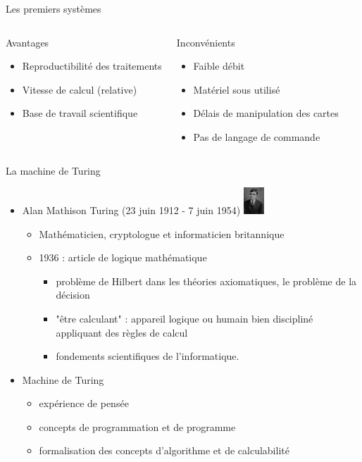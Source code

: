 \begin{frame}{Les premiers systèmes}
\begin{columns}
\begin{block}{Avantages}
\begin{itemize}
\item Reproductibilité des traitements
\item Vitesse de calcul (relative)
\item Base de travail scientifique
\end{itemize}
\end{block}
\begin{block}{Inconvénients}
\begin{itemize}
\item Faible débit
\item Matériel sous utilisé
\item Délais de manipulation des cartes
\item Pas de langage de commande
\end{itemize}
\end{block}
\end{columns}
\end{frame}

\begin{frame}{La machine de Turing \cite{wp-turing}}
\begin{itemize}
\item Alan Mathison Turing (23 juin 1912 - 7 juin 1954) \includegraphics[height=1cm]{../illustration/Alan_Turing_Aged_16.jpg}
\begin{itemize}
\item Mathématicien, cryptologue et informaticien britannique
\item 1936 : article de logique mathématique
\begin{itemize}
\item problème de Hilbert dans les théories axiomatiques, le problème de la décision
\item "être calculant" : appareil logique ou humain bien discipliné appliquant des règles de calcul
\item fondements scientifiques de l'informatique.
\end{itemize}

\end{itemize}
\item Machine de Turing
\begin{itemize}
\item expérience de pensée
\item concepts de programmation et de programme
\item formalisation des concepts d'algorithme et de calculabilité
\end{itemize}

\end{itemize}

\end{frame}

